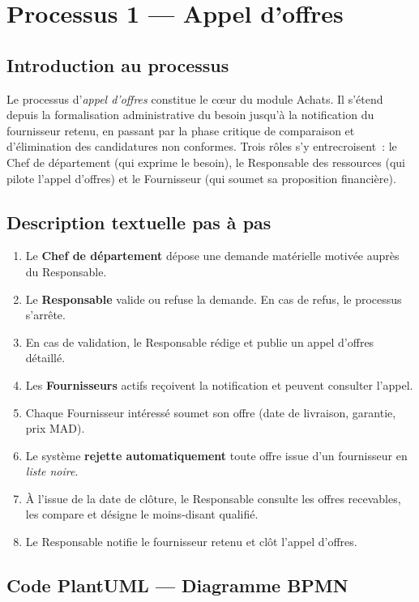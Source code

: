 \documentclass[a4paper,11pt,openany]{report}
\newcommand{\mad}{MAD}
\begin{document}
\section{Processus 1 --- Appel d'offres}

\subsection{Introduction au processus}

Le processus d'\emph{appel d'offres} constitue le cœur du module
Achats. Il s'étend depuis la formalisation administrative du
besoin jusqu'à la notification du fournisseur retenu, en passant
par la phase critique de comparaison et d'élimination des
candidatures non conformes. Trois rôles s'y entrecroisent~: le
Chef de département (qui exprime le besoin), le Responsable des
ressources (qui pilote l'appel d'offres) et le Fournisseur (qui
soumet sa proposition financière).

\subsection{Description textuelle pas à pas}

\begin{enumerate}[leftmargin=*]
  \item Le \textbf{Chef de département} dépose une demande
    matérielle motivée auprès du Responsable.
  \item Le \textbf{Responsable} valide ou refuse la demande.
    En cas de refus, le processus s'arrête.
  \item En cas de validation, le Responsable rédige et publie
    un appel d'offres détaillé.
  \item Les \textbf{Fournisseurs} actifs reçoivent la
    notification et peuvent consulter l'appel.
  \item Chaque Fournisseur intéressé soumet son offre
    (date de livraison, garantie, prix \mad).
  \item Le système \textbf{rejette automatiquement} toute offre
    issue d'un fournisseur en \textit{liste noire}.
  \item À l'issue de la date de clôture, le Responsable
    consulte les offres recevables, les compare et désigne le
    moins-disant qualifié.
  \item Le Responsable notifie le fournisseur retenu et clôt
    l'appel d'offres.
\end{enumerate}

\subsection{Code PlantUML --- Diagramme BPMN}
\end{document}
